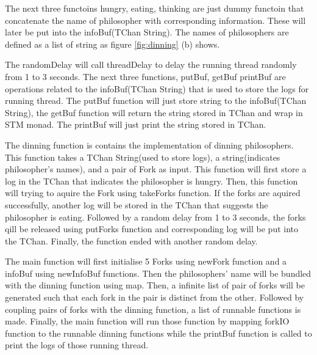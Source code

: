 \documentclass{article}
\begin{document}
\begin{normalsize}
  The next three functoins hungry, eating, thinking are just dummy functoin that
  concatenate the name of philosopher with corresponding information. These will
  later be put into the infoBuf(TChan String). The names of philosophers are
  defined as a list of string as figure \ref{fig:dinning} (b) shows.

  The randomDelay will call threadDelay to delay the running thread randomly
  from 1 to 3 seconds. The next three functions, putBuf, getBuf printBuf are
  operations related to the infoBuf(TChan String) that is used to store the logs
  for running thread. The putBuf function will just store string to the
  infoBuf(TChan String), the getBuf function will return the string stored in
  TChan and wrap in STM monad. The printBuf will just print the string stored in
  TChan.

  The dinning function is contains the implementation of dinning philosophers.
  This function takes a TChan String(used to store logs), a string(indicates
  philosopher's names), and a pair of Fork as input. This function will first
  store a log in the TChan that indicates the philosopher is hungry. Then, this
  function will trying to aquire the Fork using takeForks function. If the
  forks are aquired successfully, another log will be stored in the TChan that
  suggests the philosopher is eating. Followed by a random delay from 1 to 3
  seconds, the forks qill be released using putForks function and corresponding
  log will be put into the TChan. Finally, the function ended with another
  random delay.

  The main function will first initialise 5 Forks using newFork function and a
  infoBuf using newInfoBuf functions. Then the philosophers' name will be
  bundled with the dinning function using map. Then, a infinite list of pair of
  forks will be generated such that each fork in the pair is distinct from the
  other. Followed by coupling pairs of forks with the dinning function, a list
  of runnable functions is made. Finally, the main function will run those
  function by mapping forkIO function to the runnable dinning functions while
  the printBuf function is called to print the logs of those running thread.

   \begin{figure}[H]


\end{figure}
\end{normalsize}
\end{document}
